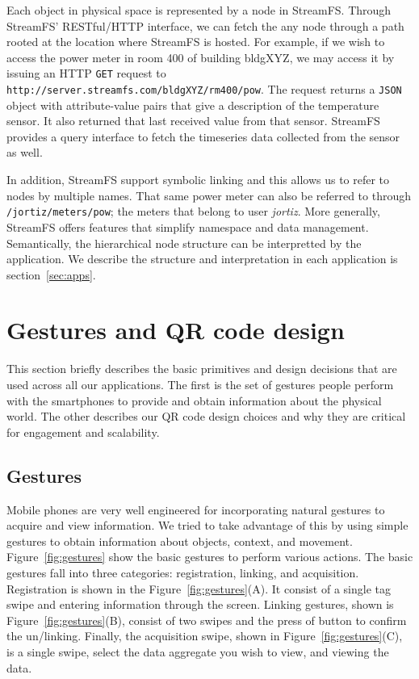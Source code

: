 Each object in physical space is represented by a node in StreamFS.  Through StreamFS' RESTful/HTTP interface, we can
fetch the any node through a path rooted at the location where StreamFS is hosted.  For example, if we wish
to access the power meter in room 400 of building bldgXYZ, we may access it by issuing an HTTP {\tt GET} request to
{\tt http://server.streamfs.com/bldgXYZ/rm400/pow}.  The request returns a {\tt JSON} object with attribute-value
pairs that give a description of the temperature sensor.  It also returned that last received value from that sensor.
StreamFS provides a query interface to fetch the timeseries data collected from the sensor as well.

In addition, StreamFS support symbolic linking and this allows us to refer to nodes by multiple names.  That same 
power meter can also be referred to through {\tt /jortiz/meters/pow}; the meters that belong to user \emph{jortiz}.
More generally, StreamFS offers features that simplify namespace and data management.  Semantically, the hierarchical
node structure can be interpretted by the application.  We describe the structure and interpretation in
each application is section~\ref{sec:apps}.


\section{Gestures and QR code design}
This section briefly describes the basic primitives and design decisions that are used across all our applications.
The first is the set of gestures people perform with the smartphones to provide and obtain information about
the physical world.  The other describes our QR code design choices and why they are critical for engagement
and scalability.

\subsection{Gestures}
Mobile phones are very well engineered for incorporating natural gestures to acquire and view information.
We tried to take advantage of this by using simple gestures to obtain information about objects, context, and
movement.
Figure~\ref{fig:gestures} show the basic gestures to perform various actions.  The basic gestures fall into three
categories: registration, linking, and acquisition.  Registration is shown in the Figure~\ref{fig:gestures}(A).
It consist of a single tag swipe and entering information through the screen.  Linking gestures, 
shown is Figure~\ref{fig:gestures}(B), consist of
two swipes and the press of button to confirm the un/linking.  Finally, the acquisition swipe, shown
in Figure~\ref{fig:gestures}(C),  is a single swipe, select the data aggregate you wish to view, and viewing the data.

